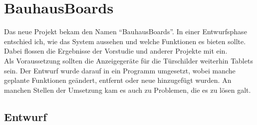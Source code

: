 \chapter{BauhausBoards}\label{BauhausBoards}
Das neue Projekt bekam den Namen ``BauhausBoards''.
In einer Entwurfsphase entschied ich, wie das System aussehen und welche Funktionen es bieten sollte. Dabei flossen die Ergebnisse der Vorstudie und anderer Projekte mit ein.\\
Als Voraussetzung sollten die Anzeigegeräte für die Türschilder weiterhin Tablets sein.
Der Entwurf wurde darauf in ein Programm umgesetzt, wobei manche geplante Funktionen geändert, entfernt oder neue hinzugefügt wurden. An manchen Stellen der Umsetzung kam es auch zu Problemen, die es zu lösen galt. 


\section{Entwurf}\label{Entwurf}
